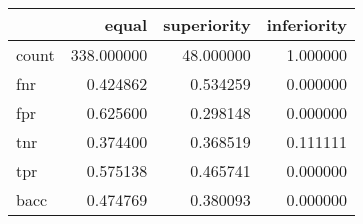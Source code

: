 \begin{tabular}{lrrr}
\toprule
{} &       equal &  superiority &  inferiority \\
\midrule
count &  338.000000 &    48.000000 &     1.000000 \\
fnr   &    0.424862 &     0.534259 &     0.000000 \\
fpr   &    0.625600 &     0.298148 &     0.000000 \\
tnr   &    0.374400 &     0.368519 &     0.111111 \\
tpr   &    0.575138 &     0.465741 &     0.000000 \\
bacc  &    0.474769 &     0.380093 &     0.000000 \\
\bottomrule
\end{tabular}
